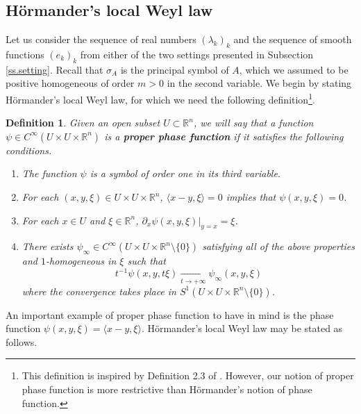 \documentclass[10pt,twoside]{article}
\newcommand{\R}{\mathbb{R}}
\newcommand{\pfty}{+\infty}
\newcommand{\zeroless}{\setminus\{0\}}
\numberwithin{theorem}{section}
\newtheorem{definition}[theorem]{Definition}
\begin{document}
\subsection{H\"ormander's local Weyl law}\label{ss.hlwl}

Let us consider the sequence of real numbers $(\lambda_k)_k$ and the sequence of smooth functions $(e_k)_k$ from either of the two settings presented in Subsection \ref{ss.setting}. Recall that $\sigma_A$ is the principal symbol of $A$, which we assumed to be positive homogeneous of order $m>0$ in the second variable. We begin by stating H\"ormander's local Weyl law, for which we need the following definition\footnote{This definition is inspired by Definition 2.3 of \cite{ho68}. However, our notion of proper phase function is more restrictive than H\"ormander's notion of phase function.}.
\begin{definition}\label{d.phase}
Given an open subset $U\subset\R^n$, we will say that a function $\psi\in C^\infty(U\times U\times\R^n)$ is a \textbf{proper phase function} if it satisfies the following conditions.
\begin{enumerate}
\item The function $\psi$ is a symbol of order one in its third variable.
\item For each $(x,y,\xi)\in U\times U\times\R^n$, $\langle x-y,\xi\rangle =0$ implies that $\psi(x,y,\xi)=0$.
\item For each $x\in U$ and $\xi\in\R^n$, $\partial_x\psi(x,y,\xi)|_{y=x}=\xi$.
\item There exists $\psi_\infty\in C^\infty(U\times U\times \R^n\zeroless)$ satisfying all of the above properties and $1$-homogeneous in $\xi$ such that
\[t^{-1}\psi(x,y,t\xi)\xrightarrow[t\to\pfty]{}\psi_\infty(x,y,\xi)\]
where the convergence takes place in $S^1(U\times U\times \R^n\zeroless)$. 
\end{enumerate}
\end{definition}
An important example of proper phase function to have in mind is the phase function $\psi(x,y,\xi)=\langle x-y,\xi\rangle$. H\"ormander's local Weyl law may be stated as follows.
\end{document}
